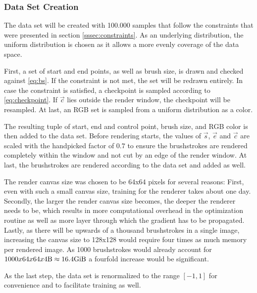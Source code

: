 
\subsubsection{Data Set Creation}

The data set will be created with 100.000 samples that follow the constraints that were presented in section \ref{sssec:constraints}.
As an underlying distribution, the uniform distribution is chosen as it allows a more evenly coverage of the data space.

First, a set of start and end points, as well as brush size, is drawn and checked against \eqref{eq:bs}.
If the constraint is not met, the set will be redrawn entirely.
In case the constraint is satisfied, a checkpoint is sampled according to \eqref{eq:checkpoint}.
If $\vec{c}$ lies outside the render window, the checkpoint will be resampled.
At last, an RGB set is sampled from a uniform distribution as a color.

The resulting tuple of start, end and control point, brush size, and RGB color is then added to the data set.
Before rendering starts, the values of $\vec{s}$, $\vec{e}$ and $\vec{c}$ are scaled with the handpicked factor of $0.7$ to ensure the brushstrokes are rendered completely within the window and not cut by an edge of the render window.
At last, the brushstrokes are rendered according to the data set and added as well.

The render canvas size was chosen to be 64x64 pixels for several reasons:
First, even with such a small canvas size, training for the renderer takes about one day.
Secondly, the larger the render canvas size becomes, the deeper the renderer needs to be, which results in more computational overhead in the optimization routine as well as more layer through which the gradient has to be propagated.
Lastly, as there will be upwards of a thousand brushstrokes in a single image, increasing the canvas size to 128x128 would require four times as much memory per rendered image. As 1000 brushstrokes would already account for $1000 x 64 x 64 x 4 \si{\byte} \approx 16.4 \si{\gibi \byte}$ a fourfold increase would be significant.


As the last step, the data set is renormalized to the range $[-1, 1]$ for convenience and to facilitate training as well.


